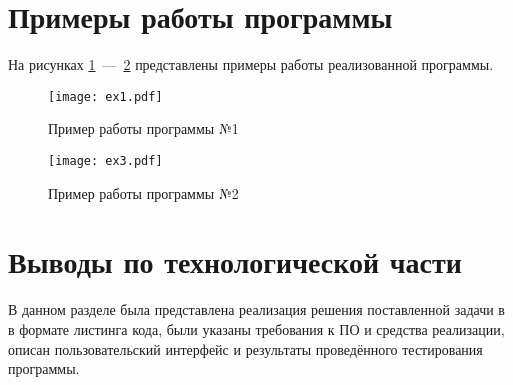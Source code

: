 %
%
%
%
%

\section{Примеры работы программы}
На рисунках \ref{img:ex1}~---~\ref{img:ex2} представлены примеры работы реализованной программы.

\begin{figure}[h!]
    \centering
    \texttt{[image: ex1.pdf]}
    \caption{Пример работы программы №1}
    \label{img:ex1}
\end{figure}

\begin{figure}[h!]
    \centering
    \texttt{[image: ex3.pdf]}
    \caption{Пример работы программы №2}
    \label{img:ex2}
\end{figure}

\section{Выводы по технологической части}
В данном разделе была представлена реализация решения поставленной задачи в в формате листинга кода, были указаны требования к ПО и средства реализации, описан пользовательский интерфейс и результаты проведённого тестирования программы.

\newpage